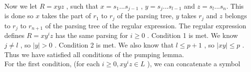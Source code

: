 \documentclass{report}
\newcommand{\me}[1]{
\begin{math}
#1
\end{math}
}
\begin{document}
 Now we let \me{R =xyz}, such that \me{x=s_1...s_{j-1}} , \me{y=s_j...s_{l-1}} and \me{z=s_l ...s_n.} This is done so\me{ x} takes the part of \me{r_1} to \me{r_j} of the parsing tree, \me{y} takes \me{r_j} and \me{z} belongs to \me{r_j} to \me{r_{n+1}}  of the parsing tree of the regular expression. The regular expression defines \me{R=xy^iz} has the same parsing for \me{i \geq 0}. Condition 1 is met. We know \me{j \neq l}, so \me{|y| > 0}. Condition 2 is met. We also know that \me{l \leq p+1}, so \me{|xy| \leq p}. Thus we have satisfied all conditions of the pumping lemma.
\ \ \\
For the first condition,  (for each \me{i \geq 0, xy^iz \in L}), we can concatenate a symbol 
	


\end{document}
